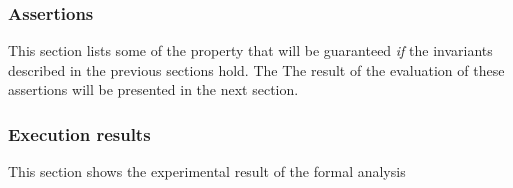 \subsubsection{Assertions}
This section lists some of the property that will be guaranteed \emph{if} the invariants described in the previous sections hold. The The result of the evaluation of these assertions will be presented in the next section.

\subsubsection{Execution results}
This section shows the experimental result of the formal analysis 
